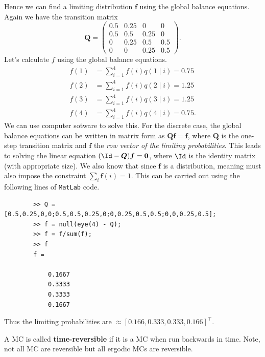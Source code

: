 \begin{exam} \label{exam: mc_state_intro_cont_1}
    Hence we can find a limiting distribution $\bm{f}$ using the global balance equations. Again we have the transition matrix
    \begin{equation*}
        \bm{Q} =
        \begin{pmatrix}
            0.5 & 0.25 & 0    & 0   \\
            0.5 & 0.5  & 0.25 & 0   \\
            0   & 0.25 & 0.5  & 0.5 \\
            0   & 0    & 0.25 & 0.5
        \end{pmatrix}.
    \end{equation*}
    Let's calculate $f$ using the global balance equations.
    \begin{align*}
        f(1) & = \sum_{i=1}^4 f(i) q(1 \mid i) = 0.75  \\
        f(2) & = \sum_{i=1}^4 f(i) q(2 \mid i) = 1.25  \\
        f(3) & = \sum_{i=1}^4 f(i) q(3 \mid i) = 1.25  \\
        f(4) & = \sum_{i=1}^4 f(i) q(4 \mid i) = 0.75.
    \end{align*}
    We can use computer sotware to solve this. For the discrete case, the global balance equations can be written in matrix form as $\bm{Q} \bm{f} = \bm{f}$, where $\bm{Q}$ is the one-step transition matrix and $\bm{f}$ the {\it row vector of the limiting probabilities}. This leads to solving the linear equation $(\Id - \bm{Q}) \bm{f}  = \bm{0}$, where $\Id$ is the identity matrix (with appropriate size). We also know that since $\bm{f}$ is a distribution, meaning must also impose the constraint $\sum_i \bm{f} (i) = 1$. This can be carried out using the following lines of \texttt{MatLab} code.
    \begin{verbatim}
        >> Q = [0.5,0.25,0,0;0.5,0.5,0.25,0;0,0.25,0.5,0.5;0,0,0.25,0.5];
        >> f = null(eye(4) - Q);
        >> f = f/sum(f);
        >> f
        f =

            0.1667
            0.3333
            0.3333
            0.1667
    \end{verbatim}
    Thus the limiting probabilities are $\approx [0.166, 0.333, 0.333, 0.166]^{\intercal}$.
\end{exam}

\begin{defe} \label{defe: trmc}
    A MC is called {\bf time-reversible} if it is a MC when run backwards in time. Note, not all MC are reversible but all ergodic MCs are reversible.
\end{defe}

